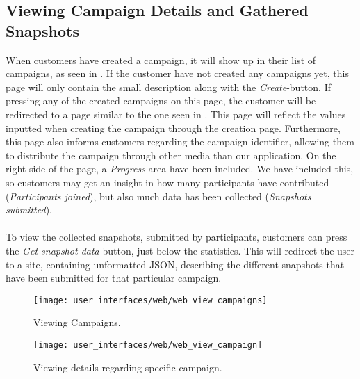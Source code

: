 \subsection{Viewing Campaign Details and Gathered Snapshots}

When customers have created a campaign, it will show up in their list of campaigns, as seen in . If the customer have not created any campaigns yet, this page will only contain the small description along with the \emph{Create}-button. If pressing any of the created campaigns on this page, the customer will be redirected to a page similar to the one seen in . This page will reflect the values inputted when creating the campaign through the creation page. Furthermore, this page also informs customers regarding the campaign identifier, allowing them to distribute the campaign through other media than our application. On the right side of the page, a \emph{Progress} area have been included. We have included this, so customers may get an insight in how many participants have contributed (\emph{Participants joined}), but also much data has been collected (\emph{Snapshots submitted}). 
\\\\
To view the collected snapshots, submitted by participants, customers can press the \emph{Get snapshot data} button, just below the statistics. This will redirect the user to a site, containing unformatted JSON, describing the different snapshots that have been submitted for that particular campaign.



\begin{figure}[!htbp]
\centering
\texttt{[image: user\_interfaces/web/web\_view\_campaigns]}
\caption{Viewing Campaigns.}
\label{fig:web_view_campaigns}
\end{figure}
\FloatBarrier

\begin{figure}[!htbp]
\centering
\texttt{[image: user\_interfaces/web/web\_view\_campaign]}
\caption{Viewing details regarding specific campaign.}
\label{fig:web_view_campaign}
\end{figure}
\FloatBarrier

